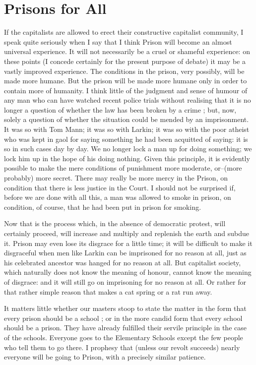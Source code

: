 \documentclass{book}
\begin{document}
\section{Prisons for All}
If the capitalists are allowed to erect their constructive capitalist community, I speak quite seriously when I say that I think Prison will become an almost universal experience. It will not necessarily be a cruel or shameful experience: on these points (I concede certainly for the present purpose of debate) it may be a vastly improved experience. The conditions in the prison, very possibly, will be made more humane. But the prison will be made more humane only in order to contain more of humanity. I think little of the judgment and sense of humour of any man who can have watched recent police trials without realising that it is no longer a question of whether the law has been broken by a crime ; but, now, solely a question of whether the situation could be mended by an imprisonment. It was so with Tom Mann; it was so with Larkin; it was so with the poor atheist who was kept in gaol for saying something he had been acquitted of saying: it is so in such cases day by day. We no longer lock a man up for doing something; we lock him up in the hope of his doing nothing. Given this principle, it is evidently possible to make the mere conditions of punishment more moderate, or–(more probably) more secret. There may really be more mercy in the Prison, on condition that there is less justice in the Court. I should not be surprised if, before we are done with all this, a man was allowed to smoke in prison, on condition, of course, that he had been put in prison for smoking.

Now that is the process which, in the absence of democratic protest, will certainly proceed, will increase and multiply and replenish the earth and subdue it. Prison may even lose its disgrace for a little time; it will be difficult to make it disgraceful when men like Larkin can be imprisoned for no reason at all, just as his celebrated ancestor was hanged for no reason at all. But capitalist society, which naturally does not know the meaning of honour, cannot know the meaning of disgrace: and it will still go on imprisoning for no reason at all. Or rather for that rather simple reason that makes a cat spring or a rat run away.

It matters little whether our masters stoop to state the matter in the form that every prison should be a school ; or in the more candid form that every school should be a prison. They have already fulfilled their servile principle in the case of the schools. Everyone goes to the Elementary Schools except the few people who tell them to go there. I prophesy that (unless our revolt succeeds) nearly everyone will be going to Prison, with a precisely similar patience.
\end{document}
